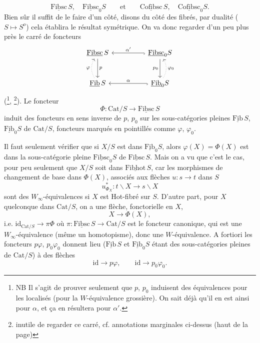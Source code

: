 \documentclass[11pt]{article}
\newcommand{\printedpage}[1]{\marginpar{\footnotesize p.~#1}}
\newcommand{\msp}[1]{\marginpar{\footnotesize [#1]}}
\newcommand{\Cat}{\mathrm{Cat}}
\newcommand{\uc}[1]{\underline{\mathrm{#1}}}
\begin{document}
\[
\uc{Fibsc}\,S,\quad \uc{Fibsc}_0S \qquad \text{et} \qquad \uc{Cofibsc}\,S,\quad \uc{Cofibsc}_0S.
\]
Bien sûr il suffit de le faire d'un côté, disons du côté des fibrés, par dualité ($S \longmapsto S^o$) cela établira le résultat symétrique. On va donc regarder d'un peu plus près le carré de foncteurs
\[
\begin{tikzcd}[column sep=huge, row sep=large]
\uc{Fibsc}\,S \arrow[d, "p"] & \uc{Fibsc}_0S \arrow[l, hook, "\alpha'"'] \arrow[d, "p_0"'] \\
\uc{Fib}\,S \arrow[u, dotted, bend left, "\varphi"] & \uc{Fib}_0S \arrow[l, hook, "\alpha"'] \arrow[u, dotted, bend right, "\varphi_0"']
\end{tikzcd}
\]
(\footnote[37]{NB Il s'agit de prouver seulement que $p$, $p_0$ induisent des équivalences pour les localisés (pour la $W$-équivalence grossière). On sait déjà qu'il en est ainsi pour $\alpha$, et ça en résultera pour $\alpha'$.}, \footnote[38]{inutile de regarder ce carré, cf. annotations marginales ci-dessus (haut de la page)}). Le foncteur
\[
\Phi : \Cat/S \longrightarrow \uc{Fibsc}\,S
\]
induit des foncteurs en sens inverse de $p$, $p_0$ sur les sous-catégories pleines $\uc{Fib}\,S$, $\uc{Fib}_0S$ de $\Cat/S$, foncteurs marqués en pointillés comme $\varphi$, $\varphi_0$.

\msp{page 54}

Il faut seulement vérifier que si $X/S$ est dans $\uc{Fib}_0S$, alors $\varphi(X) = \Phi(X)$ est dans la sous-catégorie pleine $\uc{Fibsc}_0S$ de $\uc{Fibsc}\,S$. Mais on a vu que c'est le cas, pour peu seulement que $X/S$ soit dans $\uc{Fibhot}\,S$, car les morphismes de changement de base dans $\Phi(X)$, associés aux flèches $u : s \longrightarrow t$ dans $S$
\[
u^*_{\Phi_X} : t\backslash X \longrightarrow s\backslash X
\]
sont des $W_\infty$-équivalences si $X$ est Hot-fibré sur $S$. D'autre part, pour $X$ quelconque dans $\Cat/S$, on a une flèche, fonctorielle en $X$,
\[
X \longrightarrow \Phi(X),
\]
i.e. $\mathrm{id}_{\Cat/S} \longrightarrow \pi\Phi$ où $\pi : \uc{Fibsc}\,S \longrightarrow \Cat/S$ est le foncteur canonique, qui est une $W_\infty$-équivalence (même un homotopisme), donc une $W$-équivalence. A fortiori les foncteurs $p\varphi$, $p_0\varphi_0$ donnent lieu ($\uc{Fib}\,S$ et $\uc{Fib}_0S$ étant des sous-catégories pleines de $\Cat/S$) à des flèches
\[
\mathrm{id} \longrightarrow p\varphi, \qquad \mathrm{id} \longrightarrow p_0\varphi_0.
\]

\printedpage{34}
\end{document}
